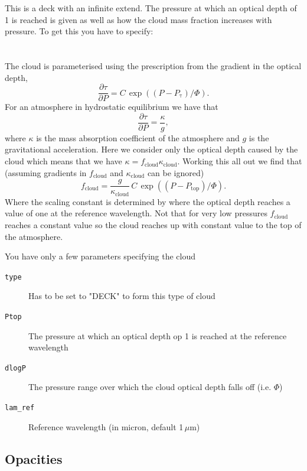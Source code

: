 \documentclass[12pt]{article}
\begin{document}
This is a deck with an infinite extend. The pressure at which an optical depth of 1 is reached is given as well as how the cloud mass fraction increases with pressure. To get this you have to specify:
\\
\\
\\
The cloud is parameterised using the prescription from the gradient in the optical depth,
\begin{equation}
\frac{\partial \tau}{\partial P}=C\,\exp{((P-P_\mathrm{\tau})/\Phi)}.
\end{equation}
For an atmosphere in hydrostatic equilibrium we have that
\begin{equation}
\frac{\partial \tau}{\partial P}=\frac{\kappa}{g},
\end{equation}
where $\kappa$ is the mass absorption coefficient of the atmosphere and $g$ is the gravitational acceleration. Here we consider only the optical depth caused by the cloud which means that we have $\kappa=f_\mathrm{cloud}\kappa_\mathrm{cloud}$. Working this all out we find that (assuming gradients in $f_\mathrm{cloud}$ and $\kappa_\mathrm{cloud}$ can be ignored)
\begin{equation}
f_\mathrm{cloud}=\frac{g}{\kappa_\mathrm{cloud}}\,C\,\exp{((P-P_\mathrm{top})/\Phi)}.
\end{equation}
Where the scaling constant is determined by where the optical depth reaches a value of one at the reference wavelength. Not that for very low pressures $f_\mathrm{cloud}$ reaches a constant value so the cloud reaches up with constant value to the top of the atmosphere.

You have only a few parameters specifying the cloud

\begin{description}
\item[\texttt{type}]
Has to be set to "DECK" to form this type of cloud
\item[\texttt{Ptop}]
The pressure at which an optical depth op 1 is reached at the reference wavelength
\item[\texttt{dlogP}]
The pressure range over which the cloud optical depth falls off (i.e. $\Phi$)
\item[\texttt{lam\_ref}]
Reference wavelength (in micron, default 1\,$\mu$m)
\end{description}

\subsection{Opacities}
\end{document}
